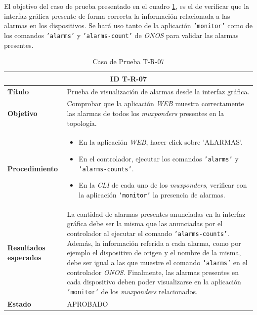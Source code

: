 El objetivo del caso de prueba presentado en el cuadro \ref{tab:TR07}, es el de verificar que la interfaz gráfica presente de forma correcta la información relacionada a las alarmas en los dispositivos. 
Se hará uso tanto de la aplicación \texttt{'monitor'} como de los comandos \texttt{'alarms'} y \texttt{'alarms-count'} de \textit{ONOS} para validar las alarmas presentes.


\begin{table}[H]
  \centering
  \begin{tabular}{ |m{2.5cm}|m{11cm}|  }
  \hline
  \multicolumn{2}{|c|}{ \textbf{ID T-R-07} } \\
  \hline
  \centering
  \textbf{Título} & Prueba de visualización de alarmas desde la interfaz gráfica.  \\
  \hline
  \centering
  \textbf{Objetivo} & Comprobar que la aplicación \textit{WEB} muestra correctamente las alarmas de todos los \textit{muxponders} presentes en la topología.   \\
  \hline
  \centering
  \textbf{Procedimiento} & \begin{itemize}
    \item En la aplicación \textit{WEB}, hacer click sobre 'ALARMAS'.
    \item En el controlador, ejecutar los comandos \texttt{'alarms'} y \texttt{'alarms-counts'}. 
    \item En la \textit{CLI} de cada uno de los \textit{muxponders}, verificar con la aplicación \texttt{'monitor'} la presencia de alarmas.
  \end{itemize}     \\
  \hline
  \centering
  \textbf{Resultados esperados} & 
  La cantidad de alarmas presentes anunciadas en la interfaz gráfica debe ser la misma que las anunciadas por el controlador al ejecutar el comando \texttt{'alarms-counts'}.
Además, la información referida a cada alarma, como por ejemplo el dispositivo de origen y el nombre de la misma, debe ser igual a las que muestre el comando \texttt{'alarms'} en el controlador \textit{ONOS}.
Finalmente, las alarmas presentes en cada dispositivo deben poder visualizarse en la aplicación \texttt{'monitor'} de los \textit{muxponders} relacionados. 
    \\
  
    \hline
  \centering
    \textbf{Estado}    & APROBADO  \\
  \hline
  \end{tabular}
  
  \caption{Caso de Prueba T-R-07}
  \label{tab:TR07}
  \end{table}

